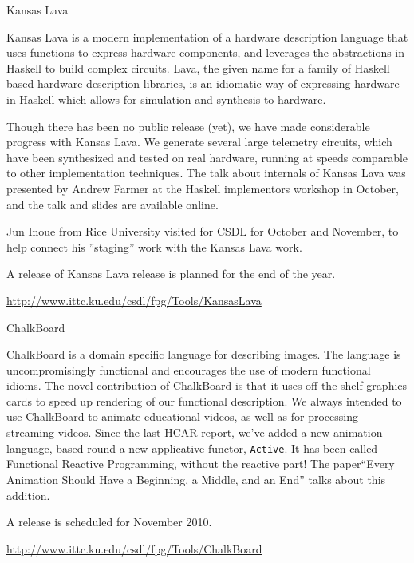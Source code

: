 \documentclass{article}
\begin{document}
\begin{hcarentry}{Kansas Lava}
\makeheader

Kansas Lava is a modern implementation of a hardware description language
that uses functions to express hardware components,
and leverages the abstractions in Haskell to build complex circuits. 
Lava, 
the given name for a family of Haskell based hardware description libraries,
is an idiomatic way of expressing hardware in Haskell which allows for simulation and
synthesis to hardware.

Though there has been no public release (yet), we have made considerable
progress with Kansas Lava. We generate several large telemetry circuits,
which have been synthesized and tested on real hardware, running at speeds
comparable to other implementation techniques.
The talk about internals of Kansas Lava was presented by Andrew Farmer at the
Haskell implementors workshop in October, and the talk and slides are available online.

Jun Inoue from Rice University visited for CSDL for October and November, to help
connect his ''staging'' work with the Kansas Lava work.

A release of Kansas Lava release is planned for the end of the year.

\FurtherReading
  \url{http://www.ittc.ku.edu/csdl/fpg/Tools/KansasLava}

\end{hcarentry}

\begin{hcarentry}{ChalkBoard}
\makeheader

ChalkBoard is a domain specific language for describing images. 
The language is uncompromisingly functional
and encourages the use of modern functional idioms.
The novel contribution of ChalkBoard is that it uses off-the-shelf
graphics cards to speed up rendering of our functional description.
We always intended to use ChalkBoard to animate educational
videos, as well as for processing streaming videos.
Since the last HCAR report, we've added a new animation language, based round a new applicative
functor, \verb|Active|. It has been called Functional Reactive Programming,
without the reactive part! The paper``Every Animation Should Have a Beginning, a Middle, and an End'' talks
about this addition. 

A release is scheduled for November 2010.

\FurtherReading
  \url{http://www.ittc.ku.edu/csdl/fpg/Tools/ChalkBoard}

\end{hcarentry}
\end{document}
